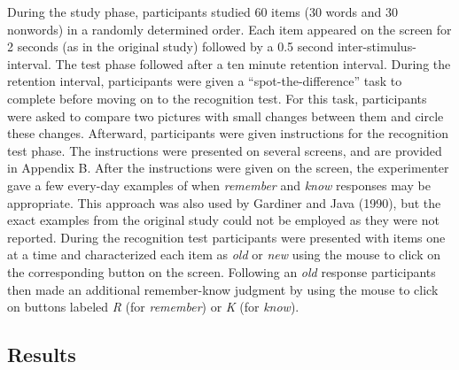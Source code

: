 \documentclass[english,,man,floatsintext]{apa6}
\begin{document}
During the study phase, participants studied 60 items (30 words and 30 nonwords) in a randomly determined order. Each item appeared on the screen for 2 seconds (as in the original study) followed by a 0.5 second inter-stimulus-interval. The test phase followed after a ten minute retention interval. During the retention interval, participants were given a \enquote{spot-the-difference} task to complete before moving on to the recognition test. For this task, participants were asked to compare two pictures with small changes between them and circle these changes.
Afterward, participants were given instructions for the recognition test phase. The instructions were presented on several screens, and are provided in Appendix B. After the instructions were given on the screen, the experimenter gave a few every-day examples of when \emph{remember} and \emph{know} responses may be appropriate. This approach was also used by Gardiner and Java (1990), but the exact examples from the original study could not be employed as they were not reported. During the recognition test participants were presented with items one at a time and characterized each item as \emph{old} or \emph{new} using the mouse to click on the corresponding button on the screen. Following an \emph{old} response participants then made an additional remember-know judgment by using the mouse to click on buttons labeled \emph{R} (for \emph{remember}) or \emph{K} (for \emph{know}).

\hypertarget{results}{%
\subsection{Results}\label{results}}
\end{document}

